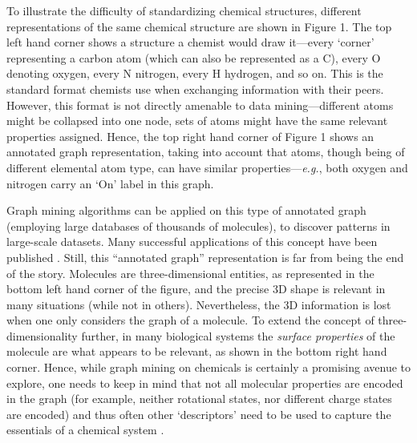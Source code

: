 \documentclass{sig-alternate}
\begin{document}
To illustrate the difficulty of standardizing chemical structures, different
representations of the same chemical structure are shown in Figure 1. The top
left hand corner shows a structure a chemist would draw it---every `corner'
representing a carbon atom (which can also be represented as a C), every O
denoting oxygen, every N nitrogen, every H hydrogen, and so on. This is the
standard format chemists use when exchanging information with their peers.
However, this format is not directly amenable to data mining---different atoms might
be collapsed into one node, sets of atoms might have the same relevant
properties assigned. Hence, the top right hand corner of Figure 1 shows an
annotated graph representation, taking into account that atoms, though being of
different elemental atom type, can have similar properties---\emph{e.g.}, both oxygen
and nitrogen carry an `On' label in this graph.


Graph mining algorithms can be applied on this type of annotated graph
(employing large databases of thousands of molecules), to discover
patterns in large-scale datasets.  Many successful applications of
this concept have been published \cite{wegner2006,horst2009}. Still,
this ``annotated graph'' representation is far from being the end of
the story. Molecules are three-dimensional entities, as represented in
the bottom left hand corner of the figure, and the precise 3D shape is
relevant in many situations (while not in others).  Nevertheless, the
3D information is lost when one only considers the graph of a
molecule. To extend the concept of three-dimensionality further, in
many biological systems the \emph{surface properties} of the molecule
are what appears to be relevant, as shown in the bottom right hand
corner.  Hence, while graph mining on chemicals is certainly a
promising avenue to explore, one needs to keep in mind that not all
molecular properties are encoded in the graph (for example, neither
rotational states, nor different charge states are encoded) and thus
often other `descriptors' need to be used to capture the essentials of
a chemical system \cite{bender2004}.
\end{document}
